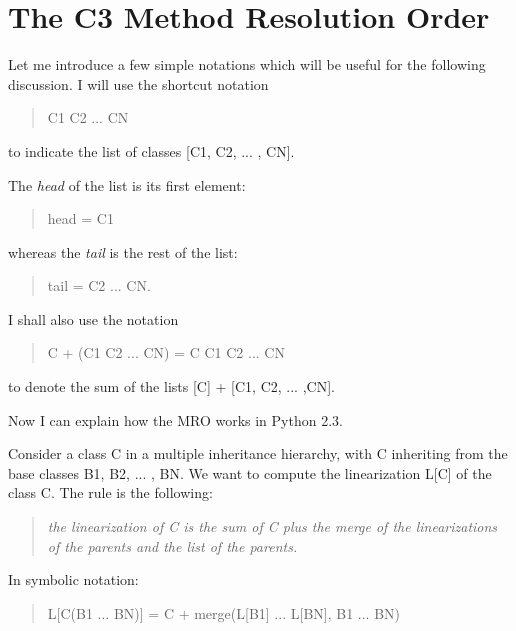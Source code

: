 \documentclass[10pt,a4paper,english]{article}
\begin{document}

\hypertarget{the-c3-method-resolution-order}{}
\section*{The C3 Method Resolution Order}

Let me introduce a few simple notations which will be useful for the
following discussion.  I will use the shortcut notation
\begin{quote}

C1 C2 ... CN
\end{quote}

to indicate the list of classes {[}C1, C2, ... , CN].

The \emph{head} of the list is its first element:
\begin{quote}

head = C1
\end{quote}

whereas the \emph{tail} is the rest of the list:
\begin{quote}

tail = C2 ... CN.
\end{quote}

I shall also use the notation
\begin{quote}

C + (C1 C2 ... CN) = C C1 C2 ... CN
\end{quote}

to denote the sum of the lists {[}C] + {[}C1, C2, ... ,CN].

Now I can explain how the MRO works in Python 2.3.

Consider a class C in a multiple inheritance hierarchy, with C
inheriting from the base classes B1, B2, ...  , BN.  We want to 
compute the linearization L{[}C] of the class C. The rule is the
following:
\begin{quote}

\emph{the linearization of C is the sum of C plus the merge of the
linearizations of the parents and the list of the parents.}
\end{quote}

In symbolic notation:
\begin{quote}

L{[}C(B1 ... BN)] = C + merge(L{[}B1] ... L{[}BN], B1 ... BN)
\end{quote}
\end{document}
